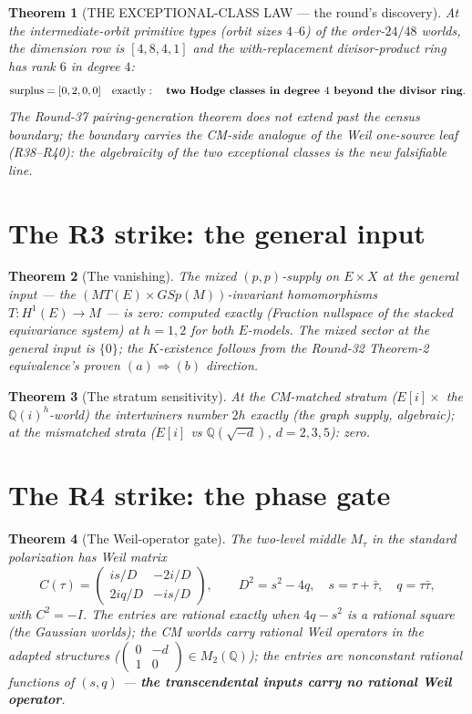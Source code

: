 \documentclass[11pt]{article}
\newtheorem{theorem}{Theorem}
\begin{document}
\begin{theorem}[THE EXCEPTIONAL-CLASS LAW --- the round's discovery]
At the intermediate-orbit primitive types (orbit sizes $4$--$6$) of the
order-$24/48$ worlds, the dimension row is $[4,8,4,1]$ and the
with-replacement divisor-product ring has rank $6$ in degree $4$:
\[
\operatorname{surplus} = [0,2,0,0] \quad \text{exactly}:
\quad \text{\textbf{two Hodge classes in degree $4$ beyond the divisor ring}.}
\]
The Round-37 pairing-generation theorem does not extend past the census
boundary; the boundary carries the CM-side analogue of the Weil one-source
leaf (R38--R40): the algebraicity of the two exceptional classes is the new
falsifiable line.
\end{theorem}

\section{The R3 strike: the general input}

\begin{theorem}[The vanishing]
The mixed $(p,p)$-supply on $E \times X$ at the general input --- the
$(MT(E) \times GSp(M))$-invariant homomorphisms $T : H^1(E) \to M$ --- is
zero: computed exactly (Fraction nullspace of the stacked equivariance
system) at $h = 1, 2$ for both $E$-models. The mixed sector at the general
input is $\{0\}$; the $K$-existence follows from the Round-32 Theorem-2
equivalence's proven $(a) \Rightarrow (b)$ direction.
\end{theorem}

\begin{theorem}[The stratum sensitivity]
At the CM-matched stratum ($E[i] \times$ the $\mathbb{Q}(i)^h$-world) the
intertwiners number $2h$ exactly (the graph supply, algebraic); at the
mismatched strata ($E[i]$ vs $\mathbb{Q}(\sqrt{-d})$, $d = 2,3,5$): zero.
\end{theorem}

\section{The R4 strike: the phase gate}

\begin{theorem}[The Weil-operator gate]
The two-level middle $M_\tau$ in the standard polarization has Weil matrix
\[
C(\tau) = \begin{pmatrix} is/D & -2i/D \\ 2iq/D & -is/D \end{pmatrix},
\qquad D^2 = s^2 - 4q, \quad s = \tau + \bar\tau, \quad q = \tau\bar\tau,
\]
with $C^2 = -I$. The entries are rational exactly when $4q - s^2$ is a
rational square (the Gaussian worlds); the CM worlds carry rational Weil
operators in the adapted structures ($\left(\begin{smallmatrix} 0 & -d \\
1 & 0\end{smallmatrix}\right) \in M_2(\mathbb{Q})$); the entries are
nonconstant rational functions of $(s,q)$ --- \textbf{the transcendental
inputs carry no rational Weil operator}.
\end{theorem}
\end{document}
